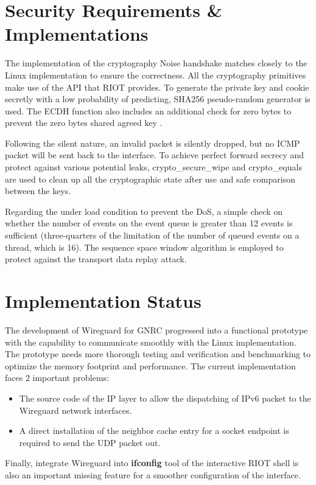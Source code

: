 \section{Security Requirements \& Implementations}
  The implementation of the cryptography Noise handshake matches closely to the Linux implementation
  to ensure the correctness. All the cryptography primitives make use of the API that RIOT 
  provides. To generate the private key and cookie secretly with a low probability of predicting, SHA256
  \cite{rfc6234} pseudo-random generator is used. The ECDH function also includes an 
  additional check for zero bytes to prevent the zero bytes shared agreed key \cite{zeros}.

  Following the silent nature, an invalid packet is silently dropped, but no ICMP packet
  will be sent back to the interface. To achieve perfect forward secrecy and protect
  against various potential leaks, crypto{\_}secure{\_}wipe and crypto{\_}equals are used to
  clean up all the cryptographic state after use and safe comparison between the keys.

  Regarding the under load condition to prevent the DoS, a simple check on whether the number
  of events on the event queue is greater than 12 events is sufficient (three-quarters of 
  the limitation of the number of queued events on a thread, which is 16). The sequence space
  window algorithm \cite[appendix C]{rfc2401} is employed to protect against the transport data replay attack.

\section{Implementation Status}
  The development of Wireguard for GNRC progressed into a functional prototype with the capability
  to communicate smoothly with the Linux implementation. The prototype needs more thorough
  testing and verification and benchmarking to optimize the memory footprint and performance.
  The current implementation faces 2 important problems:
  \begin{itemize}
    \item The source code of the IP layer to allow the dispatching of IPv6 packet to the 
    Wireguard network interfaces.
    \item A direct installation of the neighbor cache entry for a socket endpoint is required to
    send the UDP packet out.
  \end{itemize}
  Finally, integrate Wireguard into \textbf{ifconfig} tool of the interactive RIOT shell is also
  an important missing feature for a smoother configuration of the interface.